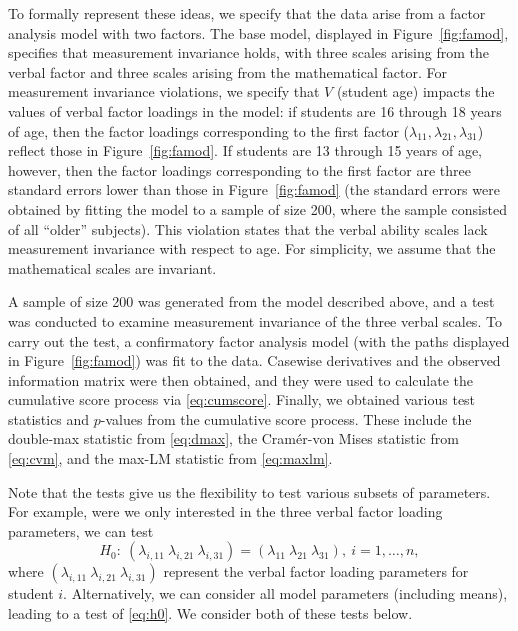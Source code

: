 \documentclass[man]{apa}
\begin{document}
To formally represent these ideas, we specify that the data arise from
a factor analysis model with two factors.  The base model, displayed in
Figure~\ref{fig:famod}, specifies that measurement invariance holds,
with three scales arising from the verbal factor and three 
scales arising from the mathematical factor.
For measurement invariance violations, we specify that $V$
(student age) impacts the values of 
verbal factor loadings in the model: 
if students are 16 through 18 years of age, then the factor
loadings corresponding to the first 
factor ($\lambda_{11}, \lambda_{21}, \lambda_{31}$) reflect those in
Figure~\ref{fig:famod}.  If students are 13 through 15 years of age,
however, then the factor loadings corresponding to the first factor
are three standard errors lower than those in Figure~\ref{fig:famod}
(the standard errors were obtained by fitting
  the model to a sample of size 200, where the sample consisted of all
  ``older'' subjects).
This violation states that the verbal ability scales
lack measurement invariance with respect to age.  For simplicity, we
assume that the mathematical scales are invariant.



A sample of size 200 was generated from the model described above, and
a test was conducted to examine measurement invariance of the three
verbal scales.  To carry out
the test, a confirmatory factor analysis model (with the paths
displayed in Figure~\ref{fig:famod}) was fit to the
data.  Casewise derivatives and 
the observed information matrix were then obtained, and they were used
to calculate the cumulative score process via
\eqref{eq:cumscore}.  Finally, we
obtained various test statistics and $p$-values from the cumulative score
process.  These include the double-max statistic from \eqref{eq:dmax},
the Cram\'{e}r-von Mises statistic from \eqref{eq:cvm}, and the max-LM
statistic from \eqref{eq:maxlm}.

Note that the tests give us the flexibility to test various subsets of
parameters.  For example, were we only interested in the 
three verbal factor loading parameters, we can test
\begin{equation}
    \label{eq:exh0}
H_0:\ (\lambda_{i,11}\ \lambda_{i,21}\ \lambda_{i,31}) =
(\lambda_{11}\ \lambda_{21}\ \lambda_{31}),\ i=1,\ldots,n,
\end{equation}
where $(\lambda_{i,11}\ \lambda_{i,21}\ \lambda_{i,31})$ represent the
verbal factor loading parameters for student $i$.  Alternatively, we
can consider all model parameters (including means), leading to a test
of \eqref{eq:h0}.  We consider both of these tests below.
\end{document}

